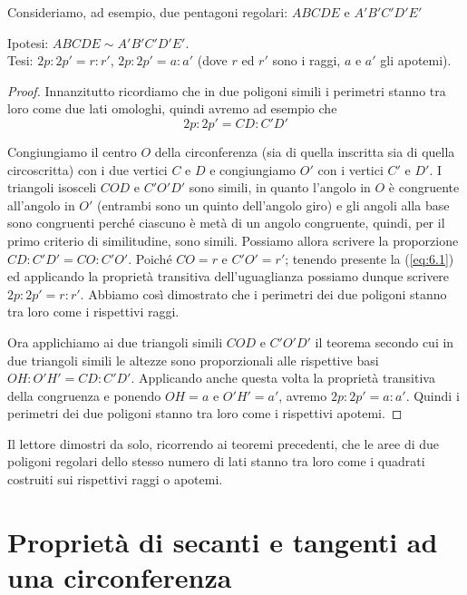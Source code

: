Consideriamo, ad esempio, due pentagoni regolari: $ABCDE$ e $A'B'C'D'E'$

\noindent Ipotesi: $ABCDE\sim A'B'C'D'E'$.\\
Tesi: $2p : 2p' = r : r'$, $2p : 2p' = a : a'$ (dove $r$ ed $r'$ sono i raggi, $a$ e $a'$ gli apotemi).

\begin{figure*}[!htb]
	\centering
\end{figure*}

\begin{proof}
Innanzitutto ricordiamo che in due poligoni simili i perimetri stanno tra loro come due lati omologhi, quindi avremo ad esempio che
\begin{equation}\label{eq:6.1}
2p : 2p' = CD : C'D'
\end{equation}

Congiungiamo il centro $O$ della circonferenza (sia di quella inscritta sia di quella circoscritta) con i due vertici $C$ e $D$ e congiungiamo $O'$ con i vertici $C'$ e $D'$. I triangoli isosceli $COD$ e $C'O'D'$ sono simili, in quanto l'angolo in $O$ è congruente all'angolo in $O'$ (entrambi sono un quinto dell'angolo giro) e gli angoli alla base sono congruenti perché ciascuno è metà di un angolo congruente, quindi, per il primo criterio di similitudine, sono simili. Possiamo allora scrivere la proporzione $CD : C'D' = CO : C'O'$.
Poiché $CO = r$ e $C'O' = r'$; tenendo presente la (\ref{eq:6.1}) ed applicando la proprietà transitiva dell'uguaglianza possiamo dunque scrivere $2p : 2p' = r : r'$. Abbiamo così dimostrato che i perimetri dei due poligoni stanno tra loro come i rispettivi raggi.

Ora applichiamo ai due triangoli simili $COD$ e $C'O'D'$ il teorema secondo cui in due triangoli simili le altezze sono proporzionali alle rispettive basi $OH : O'H' = CD : C'D'$. Applicando anche questa volta la proprietà transitiva della congruenza e ponendo $OH = a$ e $O'H' =a'$, avremo $2p : 2p' = a : a'$.
Quindi i perimetri dei due poligoni stanno tra loro come i rispettivi apotemi.
\end{proof}

Il lettore dimostri da solo, ricorrendo ai teoremi precedenti, che le aree di due poligoni regolari dello stesso numero di lati stanno tra loro come i quadrati costruiti sui rispettivi raggi o apotemi.


\section{Proprietà di secanti e tangenti ad una circonferenza}\label{sect:proprieta_secanti_tangenti}

